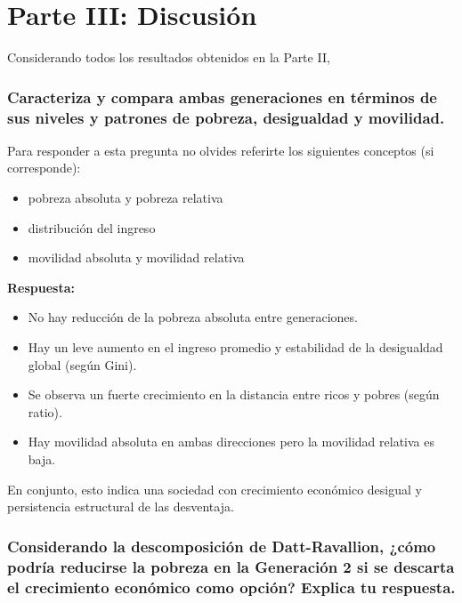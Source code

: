 \documentclass[
]{article}
\providecommand{\tightlist}{%
  \setlength{\itemsep}{0pt}\setlength{\parskip}{0pt}}\usepackage{longtable,booktabs,array}
\begin{document}
\section{Parte III: Discusión}\label{parte-iii-discusiuxf3n}

Considerando todos los resultados obtenidos en la Parte II,

\subsubsection{Caracteriza y compara ambas generaciones en términos de
sus niveles y patrones de pobreza, desigualdad y
movilidad.}\label{caracteriza-y-compara-ambas-generaciones-en-tuxe9rminos-de-sus-niveles-y-patrones-de-pobreza-desigualdad-y-movilidad.}

Para responder a esta pregunta no olvides referirte los siguientes
conceptos (si corresponde):

\begin{itemize}
\tightlist
\item
  pobreza absoluta y pobreza relativa
\item
  distribución del ingreso
\item
  movilidad absoluta y movilidad relativa
\end{itemize}

\textbf{Respuesta:}

\begin{itemize}
\item
  No hay reducción de la pobreza absoluta entre generaciones.
\item
  Hay un leve aumento en el ingreso promedio y estabilidad de la
  desigualdad global (según Gini).
\item
  Se observa un fuerte crecimiento en la distancia entre ricos y pobres
  (según ratio).
\item
  Hay movilidad absoluta en ambas direcciones pero la movilidad relativa
  es baja.
\end{itemize}

En conjunto, esto indica una sociedad con crecimiento económico desigual
y persistencia estructural de las desventaja.

\subsubsection{Considerando la descomposición de Datt-Ravallion, ¿cómo
podría reducirse la pobreza en la Generación 2 si se descarta el
crecimiento económico como opción? Explica tu
respuesta.}\label{considerando-la-descomposiciuxf3n-de-datt-ravallion-cuxf3mo-podruxeda-reducirse-la-pobreza-en-la-generaciuxf3n-2-si-se-descarta-el-crecimiento-econuxf3mico-como-opciuxf3n-explica-tu-respuesta.}
\end{document}
